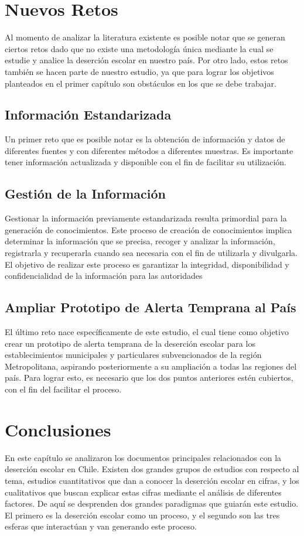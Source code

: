 \section{Nuevos Retos}
Al momento de analizar la literatura existente es posible notar que se generan ciertos retos dado que no existe una metodología única mediante la cual se estudie y analice la deserción escolar en nuestro país. 
Por otro lado, estos retos también se hacen parte de nuestro estudio, ya que para lograr los objetivos planteados en el primer capítulo son obstáculos en los que se debe trabajar. 
\subsection{Información Estandarizada}
Un primer reto que es posible notar es la obtención de información y datos de diferentes fuentes y con diferentes métodos a diferentes muestras. 
Es importante tener información actualizada y disponible con el fin de facilitar su utilización. 
\subsection{Gestión de la Información}
Gestionar la información previamente estandarizada resulta primordial para la generación de conocimientos. Este proceso de creación de conocimientos implica determinar la información que se precisa, recoger y analizar la información, registrarla y recuperarla cuando sea necesaria con el fin de utilizarla y divulgarla. 
El objetivo de realizar este proceso es garantizar la integridad, disponibilidad y confidencialidad de la información para las autoridades 
\subsection{Ampliar Prototipo de Alerta Temprana al País}
El último reto nace específicamente de este estudio, el cual tiene como objetivo crear un prototipo de alerta temprana de la deserción escolar para los establecimientos municipales y particulares subvencionados de la región Metropolitana, aspirando posteriormente a su ampliación a todas las regiones del país. Para lograr esto, es necesario que los dos puntos anteriores estén cubiertos, con el fin del facilitar el proceso.

\section{Conclusiones}
En este capítulo se analizaron los documentos principales relacionados con la deserción escolar en Chile. Existen dos grandes grupos de estudios con respecto al tema, estudios cuantitativos que dan a conocer la deserción escolar en cifras, y los cualitativos que buscan explicar estas cifras mediante el análisis de diferentes factores. De aquí se desprenden dos grandes paradigmas que guiarán este estudio. El primero es la deserción escolar como un proceso, y el segundo son las tres esferas que interactúan y van generando este proceso. 

